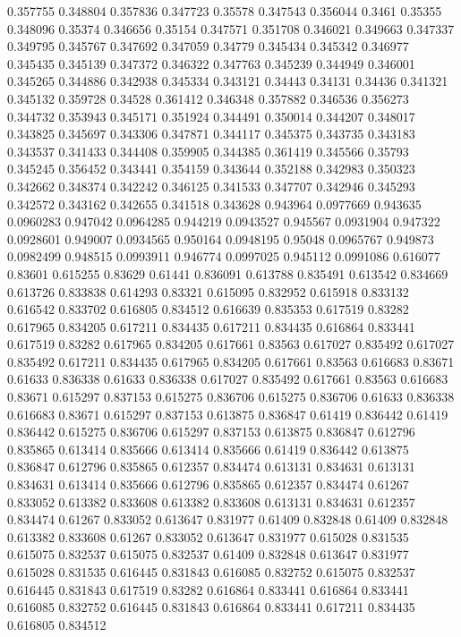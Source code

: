 0.357755 0.348804
0.357836 0.347723
0.35578 0.347543
0.356044 0.3461
0.35355 0.348096
0.35374 0.346656
0.35154 0.347571
0.351708 0.346021
0.349663 0.347337
0.349795 0.345767
0.347692 0.347059
0.34779 0.345434
0.345342 0.346977
0.345435 0.345139
0.347372 0.346322
0.347763 0.345239
0.344949 0.346001
0.345265 0.344886
0.342938 0.345334
0.343121 0.34443
0.34131 0.34436
0.341321 0.345132
0.359728 0.34528
0.361412 0.346348
0.357882 0.346536
0.356273 0.344732
0.353943 0.345171
0.351924 0.344491
0.350014 0.344207
0.348017 0.343825
0.345697 0.343306
0.347871 0.344117
0.345375 0.343735
0.343183 0.343537
0.341433 0.344408
0.359905 0.344385
0.361419 0.345566
0.35793 0.345245
0.356452 0.343441
0.354159 0.343644
0.352188 0.342983
0.350323 0.342662
0.348374 0.342242
0.346125 0.341533
0.347707 0.342946
0.345293 0.342572
0.343162 0.342655
0.341518 0.343628
0.943964 0.0977669
0.943635 0.0960283
0.947042 0.0964285
0.944219 0.0943527
0.945567 0.0931904
0.947322 0.0928601
0.949007 0.0934565
0.950164 0.0948195
0.95048 0.0965767
0.949873 0.0982499
0.948515 0.0993911
0.946774 0.0997025
0.945112 0.0991086
0.616077 0.83601
0.615255 0.83629
0.61441 0.836091
0.613788 0.835491
0.613542 0.834669
0.613726 0.833838
0.614293 0.83321
0.615095 0.832952
0.615918 0.833132
0.616542 0.833702
0.616805 0.834512
0.616639 0.835353
0.617519 0.83282
0.617965 0.834205
0.617211 0.834435
0.617211 0.834435
0.616864 0.833441
0.617519 0.83282
0.617965 0.834205
0.617661 0.83563
0.617027 0.835492
0.617027 0.835492
0.617211 0.834435
0.617965 0.834205
0.617661 0.83563
0.616683 0.83671
0.61633 0.836338
0.61633 0.836338
0.617027 0.835492
0.617661 0.83563
0.616683 0.83671
0.615297 0.837153
0.615275 0.836706
0.615275 0.836706
0.61633 0.836338
0.616683 0.83671
0.615297 0.837153
0.613875 0.836847
0.61419 0.836442
0.61419 0.836442
0.615275 0.836706
0.615297 0.837153
0.613875 0.836847
0.612796 0.835865
0.613414 0.835666
0.613414 0.835666
0.61419 0.836442
0.613875 0.836847
0.612796 0.835865
0.612357 0.834474
0.613131 0.834631
0.613131 0.834631
0.613414 0.835666
0.612796 0.835865
0.612357 0.834474
0.61267 0.833052
0.613382 0.833608
0.613382 0.833608
0.613131 0.834631
0.612357 0.834474
0.61267 0.833052
0.613647 0.831977
0.61409 0.832848
0.61409 0.832848
0.613382 0.833608
0.61267 0.833052
0.613647 0.831977
0.615028 0.831535
0.615075 0.832537
0.615075 0.832537
0.61409 0.832848
0.613647 0.831977
0.615028 0.831535
0.616445 0.831843
0.616085 0.832752
0.615075 0.832537
0.616445 0.831843
0.617519 0.83282
0.616864 0.833441
0.616864 0.833441
0.616085 0.832752
0.616445 0.831843
0.616864 0.833441
0.617211 0.834435
0.616805 0.834512
